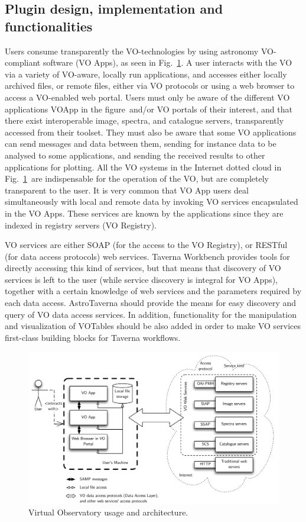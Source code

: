 \documentclass{aa}
\begin{document}
\subsection{Plugin design, implementation and functionalities}
\label{Opening}

Users consume transparently the VO-technologies by using astronomy VO-compliant software (VO Apps), as seen in Fig.~\ref{fig:VOArch}. A user interacts with the VO via a variety of VO-aware, locally run applications, and accesses either locally archived files, or remote files, either via VO protocols or using a web browser to access a VO-enabled web portal. Users must only be aware of the different VO applications \textendash VOApp in the figure\textendash\ and/or VO portals of their interest, and that there exist interoperable image, spectra, and catalogue servers, transparently accessed from their toolset. They must also be aware that some VO applications can send messages and data between them, sending for instance data to be analysed to some applications, and sending the received results to other applications for plotting. All the VO systems in the Internet \textendash dotted cloud in Fig.~\ref{fig:VOArch}\textendash\ are indispensable for the operation of the VO, but are completely transparent to the user. It is very common that VO App users deal simultaneously with local and remote data by invoking VO services encapsulated in the VO Apps. These services are known by the applications since they are indexed in registry servers (VO Registry).

VO services are either SOAP (for the access to the VO Registry), or RESTful (for data access protocols) web services. Taverna Workbench provides tools for directly accessing this kind of services, but that means that discovery of VO services is left to the user (while service discovery is integral for VO Apps), together with a certain knowledge of web services and the parameters required by each data access. AstroTaverna should provide the means for easy discovery and query of VO data access services. In addition, functionality for the manipulation and visualization of VOTables should be also added in order to make VO services first-class building blocks for Taverna workflows.

\begin{figure}[tb]
\centering 
\includegraphics[width=0.99\columnwidth]{VOArch}
\caption{Virtual Observatory usage and architecture.}
\label{fig:VOArch}
\end{figure}
\end{document}
